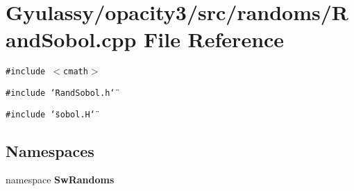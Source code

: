 \section{Gyulassy/opacity3/src/randoms/RandSobol.cpp File Reference}
\label{RandSobol_8cpp}
{\tt \#include $<$cmath$>$}\par
{\tt \#include \char`\"{}RandSobol.h\char`\"{}}\par
{\tt \#include \char`\"{}sobol.H\char`\"{}}\par
\subsection*{Namespaces}
\begin{CompactItemize}
\item 
namespace {\bf SwRandoms}
\end{CompactItemize}
